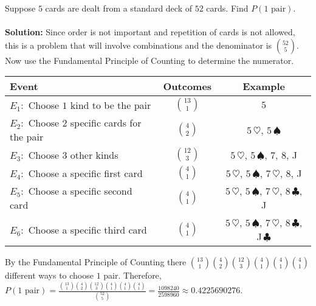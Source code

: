 \documentclass[12pt]{article}%
\newcommand{\FPC}{Fundamental Principle of Counting }
\begin{document}
\noindent Suppose $5$ cards are dealt from a standard deck of $52$ cards. Find
$P(1 \mbox{ pair})$.\\\\
\textbf{Solution:} Since order is not important and repetition of 
cards is not allowed, this is a problem that will involve combinations and
the denominator is $\binom{52}{5}$. Now use the \FPC to determine the numerator. 

\begin{center}
\begin{tabular}{lcc}
Event & Outcomes & Example\\
\hline
$E_1:$ Choose $1$ kind to be the pair & $\binom{13}{1}$ & $5$ \\
$E_2:$ Choose $2$ specific cards for the pair & $\binom{4}{2}$ & 
$5\,\heartsuit$, $5\,\spadesuit$ \\
$E_3:$ Choose $3$ other kinds & $\binom{12}{3}$ & 
$5\,\heartsuit$, $5\,\spadesuit$, $7$, $8$, J \\
$E_4:$ Choose a specific first card & $\binom{4}{1}$ & 
$5\,\heartsuit$, $5\,\spadesuit$, $7\,\heartsuit$, $8$, J \\
$E_5:$ Choose a specific second card & $\binom{4}{1}$ & 
$5\,\heartsuit$, $5\,\spadesuit$, $7\,\heartsuit$, $8\,\clubsuit$, J \\
$E_6:$ Choose a specific third card & $\binom{4}{1}$ & 
$5\,\heartsuit$, $5\,\spadesuit$, $7\,\heartsuit$, $8\,\clubsuit$, J\,$\clubsuit$ \\
\end{tabular}
\end{center}
By the \FPC there $\binom{13}{1}\binom{4}{2}\binom{12}{3}\binom{4}{1}\binom{4}{1}\binom{4}{1}$ different ways to choose $1$ pair. Therefore, $P(1 \mbox{ pair})=\frac{\binom{13}{1}\binom{4}{2}\binom{12}{3}\binom{4}{1}\binom{4}{1}\binom{4}{1}}{\binom{52}{5}}=\frac{1098240}{2598960} \approx 0.4225690276$.\\\\
\end{document}
